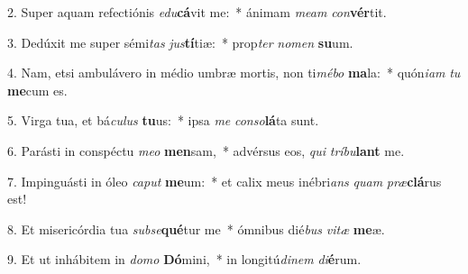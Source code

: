 2. Super aquam refectiónis \textit{e}\textit{du}\textbf{cá}vit me:~*  ánimam \textit{me}\textit{am} \textit{con}\textbf{vér}tit.\

3. Dedúxit me super sémi\textit{tas} \textit{jus}\textbf{tí}tiæ:~*  prop\textit{ter} \textit{no}\textit{men} \textbf{su}um.\

4. Nam, etsi ambulávero in médio umbræ mortis, non ti\textit{mé}\textit{bo} \textbf{ma}la:~*  quón\textit{i}\textit{am} \textit{tu} \textbf{me}cum es.\

5. Virga tua, et bá\textit{cu}\textit{lus} \textbf{tu}us:~*  ipsa \textit{me} \textit{con}\textit{so}\textbf{lá}ta sunt.\

6. Parásti in conspéctu \textit{me}\textit{o} \textbf{men}sam,~*  advérsus eos, \textit{qui} \textit{trí}\textit{bu}\textbf{lant} me.\

7. Impinguásti in óleo \textit{ca}\textit{put} \textbf{me}um:~*  et calix meus inébri\textit{ans} \textit{quam} \textit{præ}\textbf{clá}rus est!\

8. Et misericórdia tua \textit{sub}\textit{se}\textbf{qué}tur me~*  ómnibus dié\textit{bus} \textit{vi}\textit{tæ} \textbf{me}æ.\

9. Et ut inhábitem in \textit{do}\textit{mo} \textbf{Dó}mini,~*  in longitú\textit{di}\textit{nem} \textit{di}\textbf{é}rum.\

